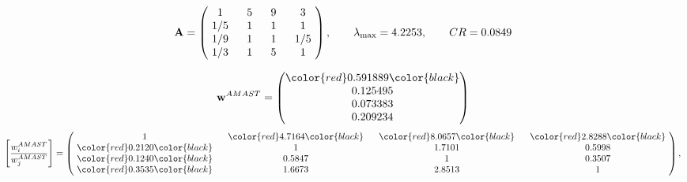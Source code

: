 \begin{example}
\begin{equation*}
\mathbf{A} =
\begin{pmatrix}
$\,\,$ 1 $\,\,$ & $\,\,$5$\,\,$ & $\,\,$9$\,\,$ & $\,\,$3 $\,\,$ \\
$\,\,$ 1/5$\,\,$ & $\,\,$ 1 $\,\,$ & $\,\,$1$\,\,$ & $\,\,$1 $\,\,$ \\
$\,\,$ 1/9$\,\,$ & $\,\,$ 1 $\,\,$ & $\,\,$ 1 $\,\,$ & $\,\,$ 1/5 $\,\,$ \\
$\,\,$ 1/3$\,\,$ & $\,\,$ 1 $\,\,$ & $\,\,$5$\,\,$ & $\,\,$ 1  $\,\,$ \\
\end{pmatrix},
\qquad
\lambda_{\max} =
4.2253,
\qquad
CR = 0.0849
\end{equation*}

\begin{equation*}
\mathbf{w}^{AMAST} =
\begin{pmatrix}
\color{red} 0.591889\color{black} \\
0.125495\\
0.073383\\
0.209234
\end{pmatrix}\end{equation*}
\begin{equation*}
\left[ \frac{{w}^{AMAST}_i}{{w}^{AMAST}_j} \right] =
\begin{pmatrix}
$\,\,$ 1 $\,\,$ & $\,\,$\color{red} 4.7164\color{black} $\,\,$ & $\,\,$\color{red} 8.0657\color{black} $\,\,$ & $\,\,$\color{red} 2.8288\color{black} $\,\,$ \\
$\,\,$\color{red} 0.2120\color{black} $\,\,$ & $\,\,$ 1 $\,\,$ & $\,\,$1.7101$\,\,$ & $\,\,$0.5998  $\,\,$ \\
$\,\,$\color{red} 0.1240\color{black} $\,\,$ & $\,\,$0.5847$\,\,$ & $\,\,$ 1 $\,\,$ & $\,\,$0.3507 $\,\,$ \\
$\,\,$\color{red} 0.3535\color{black} $\,\,$ & $\,\,$1.6673$\,\,$ & $\,\,$2.8513$\,\,$ & $\,\,$ 1  $\,\,$ \\
\end{pmatrix},
\end{equation*}


\end{example}
